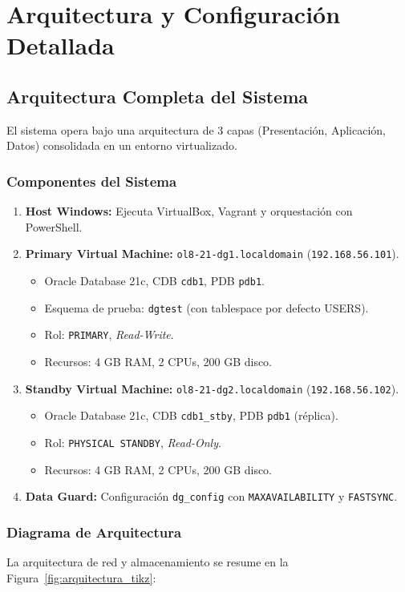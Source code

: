 \documentclass[11pt, a4paper]{report}
\begin{document}
\chapter{Arquitectura y Configuración Detallada}

\section{Arquitectura Completa del Sistema}

El sistema opera bajo una arquitectura de 3 capas (Presentación, Aplicación, Datos) consolidada en un entorno virtualizado.
\subsection{Componentes del Sistema}

\begin{enumerate}
    \item \textbf{Host Windows:} Ejecuta VirtualBox, Vagrant y orquestación con PowerShell.
\item \textbf{Primary Virtual Machine:} \texttt{ol8-21-dg1.localdomain} (\texttt{192.168.56.101}).
    \begin{itemize}
        \item Oracle Database 21c, CDB \texttt{cdb1}, PDB \texttt{pdb1}.
        \item Esquema de prueba: \texttt{dgtest} (con tablespace por defecto USERS).
\item Rol: \texttt{PRIMARY}, \textit{Read-Write}.
        \item Recursos: 4 GB RAM, 2 CPUs, 200 GB disco.
\end{itemize}
    \item \textbf{Standby Virtual Machine:} \texttt{ol8-21-dg2.localdomain} (\texttt{192.168.56.102}).
\begin{itemize}
        \item Oracle Database 21c, CDB \texttt{cdb1\_stby}, PDB \texttt{pdb1} (réplica).
\item Rol: \texttt{PHYSICAL STANDBY}, \textit{Read-Only}.
        \item Recursos: 4 GB RAM, 2 CPUs, 200 GB disco.
\end{itemize}
    \item \textbf{Data Guard:} Configuración \texttt{dg\_config} con \texttt{MAXAVAILABILITY} y \texttt{FASTSYNC}.
\end{enumerate}

\subsection{Diagrama de Arquitectura}
La arquitectura de red y almacenamiento se resume en la Figura~\ref{fig:arquitectura_tikz}:
\end{document}
